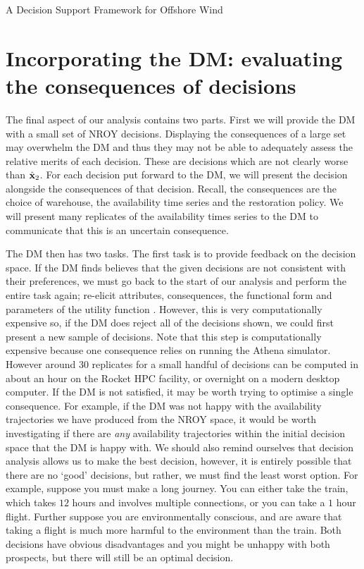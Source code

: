 \begin{chapter}{A Decision Support Framework for Offshore Wind \label{Ch:ds-for-ow}}
\section{Incorporating the DM: evaluating the consequences of decisions}
The final aspect of our analysis contains two parts. First we will provide the DM with a small set of NROY decisions. Displaying the consequences of a large set may overwhelm the DM and thus they may not be able to adequately assess the relative merits of each decision. These are decisions which are not clearly worse than $\hat{\mathbf{x}}_2$. For each decision put forward to the DM, we will present the decision alongside the consequences of that decision. Recall, the consequences are the choice of warehouse, the availability time series and the restoration policy. We will present many replicates of the availability times series to the DM to communicate that this is an uncertain consequence.

The DM then has two tasks. The first task is to provide feedback on the decision space. If the DM finds believes that the given decisions are not consistent with their preferences, we must go back to the start of our analysis and perform the entire task again; re-elicit attributes, consequences, the functional form and parameters of the utility function \citep{Smith2010}. However, this is very computationally expensive so, if the DM does reject all of the decisions shown, we could first present a new sample of decisions. Note that this step is computationally expensive because one consequence relies on running the Athena simulator. However around $30$ replicates for a small handful of decisions can be computed in about an hour on the Rocket HPC facility, or overnight on a modern desktop computer. If the DM is not satisfied, it may be worth trying to optimise a single consequence. For example, if the DM was not happy with the availability trajectories we have produced from the NROY space, it would be worth investigating if there are \textit{any} availability trajectories within the initial decision space that the DM is happy with. We should also remind ourselves that decision analysis allows us to make the best decision, however, it is entirely possible that there are no `good' decisions, but rather, we must find the least worst option. For example, suppose you must make a long journey. You can either take the train, which takes $12$ hours and involves multiple connections, or you can take a $1$ hour flight. Further suppose you are environmentally conscious, and are aware that taking a flight is much more harmful to the environment than the train. Both decisions have obvious disadvantages and you might be unhappy with both prospects, but there will still be an optimal decision.


\end{chapter}

